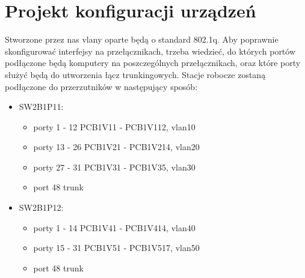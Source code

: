 \documentclass[a4paper, 12pt]{article}
\begin{document}
\section{Projekt konfiguracji urządzeń}
Stworzone przez nas vlany oparte będą o standard 802.1q. Aby poprawnie skonfigurować interfejsy na przełącznikach, trzeba wiedzieć, do których portów podłączone będą komputery na poszczególnych przełącznikach, oraz które porty służyć będą do utworzenia łącz trunkingowych. Stacje robocze zostaną podłączone do przerzutników w następujący sposób:
\begin{itemize}
\item SW2B1P11:
	\begin{itemize}
	\item porty 1 - 12 PCB1V11 - PCB1V112, vlan10 
	\item porty 13 - 26 PCB1V21 - PCB1V214, vlan20
	\item porty 27 - 31 PCB1V31 - PCB1V35, vlan30
	\item port 48 trunk
	\end{itemize}
\item SW2B1P12:
	\begin{itemize}
	\item porty 1 - 14 PCB1V41 - PCB1V414, vlan40
	\item porty 15 - 31 PCB1V51 - PCB1V517, vlan50
	\item port 48 trunk
	\end{itemize}
	

\end{itemize}
\end{document}
